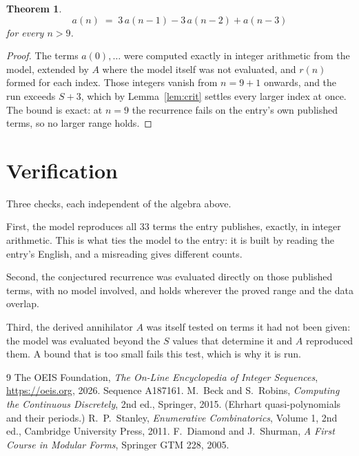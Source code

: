 \documentclass[11pt,a4paper]{article}
\theoremstyle{plain}
\newtheorem{theorem}{Theorem}
\theoremstyle{definition}
\begin{document}
\begin{theorem}
\[
a(n)\;=\;3\,a(n-1) - 3\,a(n-2) + a(n-3)
\]
for every $n>9$.
\end{theorem}

\begin{proof}
The terms $a(0),\dots$ were computed exactly in integer arithmetic from the model, extended by
$A$ where the model itself was not evaluated, and $r(n)$ formed for each index. Those integers
vanish from $n=9+1$ onwards, and the run exceeds $S+3$, which by
Lemma~\ref{lem:crit} settles every larger index at once. The bound is exact: at $n=9$ the recurrence fails on the entry's own published terms, so no larger range holds.
\end{proof}

\section{Verification}

Three checks, each independent of the algebra above.

First, the model reproduces all $33$ terms the entry publishes, exactly, in integer
arithmetic. This is what ties the model to the entry: it is built by reading the entry's
English, and a misreading gives different counts.

Second, the conjectured recurrence was evaluated directly on those published terms, with no
model involved, and holds wherever the proved range and the data overlap.

Third, the derived annihilator $A$ was itself tested on terms it had not been given: the model
was evaluated beyond the $S$ values that determine it and $A$ reproduced them. A bound that is
too small fails this test, which is why it is run.

\begin{thebibliography}{9}
 The OEIS Foundation, \emph{The On-Line Encyclopedia of Integer
Sequences}, \url{https://oeis.org}, 2026. Sequence A187161.
 M.~Beck and S.~Robins, \emph{Computing the Continuous Discretely},
2nd ed., Springer, 2015. (Ehrhart quasi-polynomials and their periods.)
 R.~P.~Stanley, \emph{Enumerative Combinatorics}, Volume 1, 2nd ed.,
Cambridge University Press, 2011.
 F.~Diamond and J.~Shurman, \emph{A First Course in Modular Forms},
Springer GTM 228, 2005.
\end{thebibliography}
\end{document}
